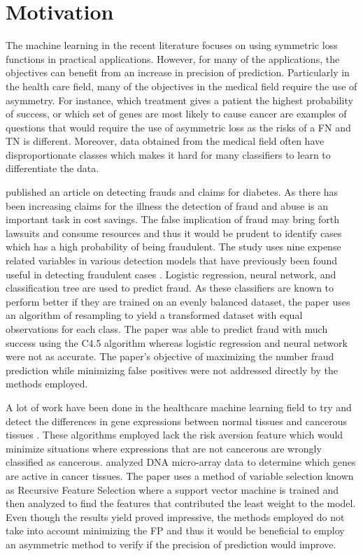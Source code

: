 \documentclass[twoside,11pt]{article}
\begin{document}
\section{Motivation}\label{motivation}
The machine learning in the recent literature focuses on using symmetric loss functions in practical applications. However, for many of the applications, the objectives can benefit from an increase in precision of prediction. Particularly in the health care field, many of the objectives in the medical field require the use of asymmetry. For instance, which treatment gives a patient the highest probability of success, or which set of genes are most likely to cause cancer are examples of questions that would require the use of asymmetric loss as the risks of a FN and TN is different. Moreover, data obtained from the medical field often have disproportionate classes which makes it hard for many classifiers to learn to differentiate the data. 

\citet{Liou08} published an article on detecting frauds and claims for diabetes. As there has been increasing claims for the illness the detection of fraud and abuse is an important task in cost savings. The false implication of fraud may bring forth lawsuits and consume resources and thus it would be prudent to identify cases which has a high probability of being fraudulent. The study uses nine expense related variables in various detection models that have previously been found useful in detecting fraudulent cases \citep{Yang06}. Logistic regression, neural network, and classification tree are used to predict fraud. As these classifiers are known to perform better if they are trained on an evenly balanced dataset, the paper uses an algorithm of resampling to yield a transformed dataset with equal observations for each class. The paper was able to predict fraud with much success using the C4.5 algorithm whereas logistic regression and neural network were not as accurate. The paper's objective of maximizing the number fraud prediction while minimizing false positives were not addressed directly by the methods employed. 

A lot of work have been done in the healthcare machine learning field to try and detect the differences in gene expressions between normal tissues and cancerous tissues \citep{Ambroise02}\citep{Guyon02}. These algorithms employed lack the risk aversion feature which would minimize situations where expressions that are not cancerous are wrongly classified as cancerous. \citet{Guyon02} analyzed DNA micro-array data to determine which genes are active in cancer tissues. The paper uses a method of variable selection known as Recursive Feature Selection where a support vector machine is trained and then analyzed to find the features that contributed the least weight to the model. Even though the results yield proved impressive, the methods employed do not take into account minimizing the FP and thus it would be beneficial to employ an asymmetric method to verify if the precision of prediction would improve.
\end{document}
